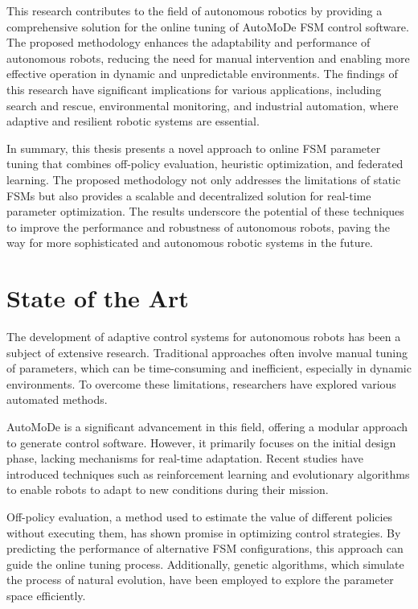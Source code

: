 \documentclass{ULBreport}
\begin{document}
This research contributes to the field of autonomous robotics by providing a comprehensive solution for the online tuning of AutoMoDe FSM control software. The proposed methodology enhances the adaptability and performance of autonomous robots, reducing the need for manual intervention and enabling more effective operation in dynamic and unpredictable environments. The findings of this research have significant implications for various applications, including search and rescue, environmental monitoring, and industrial automation, where adaptive and resilient robotic systems are essential.

In summary, this thesis presents a novel approach to online FSM parameter tuning that combines off-policy evaluation, heuristic optimization, and federated learning. The proposed methodology not only addresses the limitations of static FSMs but also provides a scalable and decentralized solution for real-time parameter optimization. The results underscore the potential of these techniques to improve the performance and robustness of autonomous robots, paving the way for more sophisticated and autonomous robotic systems in the future.





\chapter{State of the Art}
The development of adaptive control systems for autonomous robots has been a subject of extensive research. Traditional approaches often involve manual tuning of parameters, which can be time-consuming and inefficient, especially in dynamic environments. To overcome these limitations, researchers have explored various automated methods.

AutoMoDe is a significant advancement in this field, offering a modular approach to generate control software. However, it primarily focuses on the initial design phase, lacking mechanisms for real-time adaptation. Recent studies have introduced techniques such as reinforcement learning and evolutionary algorithms to enable robots to adapt to new conditions during their mission.

Off-policy evaluation, a method used to estimate the value of different policies without executing them, has shown promise in optimizing control strategies. By predicting the performance of alternative FSM configurations, this approach can guide the online tuning process. Additionally, genetic algorithms, which simulate the process of natural evolution, have been employed to explore the parameter space efficiently.
\end{document}

